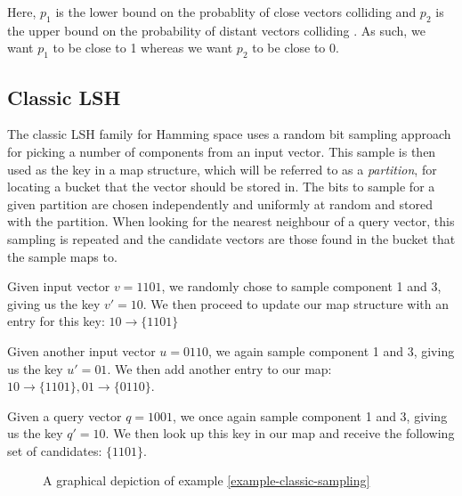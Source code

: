 Here, $p_1$ is the lower bound on the probablity of close vectors colliding and $p_2$ is the upper bound on the probability of distant vectors colliding \cite[p. 100]{DBLP:books/cu/LeskovecRU14}. As such, we want $p_1$ to be close to 1 whereas we want $p_2$ to be close to 0.

\subsection{Classic LSH}
\label{background-classic-lsh}

The classic LSH family for Hamming space uses a random bit sampling approach for picking a number of components from an input vector. This sample is then used as the key in a map structure, which will be referred to as a \textit{partition}, for locating a bucket that the vector should be stored in. The bits to sample for a given partition are chosen independently and uniformly at random and stored with the partition. When looking for the nearest neighbour of a query vector, this sampling is repeated and the candidate vectors are those found in the bucket that the sample maps to.

\begin{example}
\label{example-classic-sampling}
  Given input vector $v = 1101$, we randomly chose to sample component 1 and 3, giving us the key $v' = 10$. We then proceed to update our map structure with an entry for this key: $10 \rightarrow \{1101\}$

  Given another input vector $u = 0110$, we again sample component 1 and 3, giving us the key $u' = 01$. We then add another entry to our map: $10 \rightarrow \{1101\}, 01 \rightarrow \{0110\}$.

  Given a query vector $q = 1001$, we once again sample component 1 and 3, giving us the key $q' = 10$. We then look up this key in our map and receive the following set of candidates: $\{1101\}$.
\end{example}

\begin{figure}[ht]
  \centering

  \caption{A graphical depiction of example \ref{example-classic-sampling}}
  \label{figure-classic-sampling}
\end{figure}

